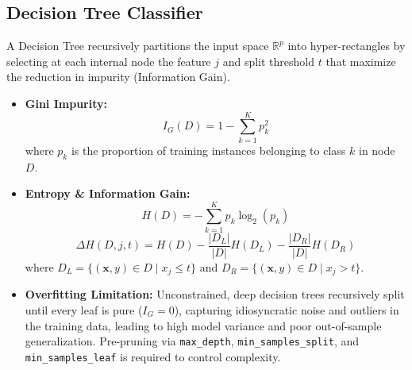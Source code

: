 \documentclass[12pt,a4paper]{article}
\begin{document}
\subsection{Decision Tree Classifier}
A Decision Tree recursively partitions the input space $\mathbb{R}^p$ into hyper-rectangles by selecting at each internal node the feature $j$ and split threshold $t$ that maximize the reduction in impurity (Information Gain).
\begin{itemize}
\item \textbf{Gini Impurity:}
\begin{equation}
I_G(D) = 1 - \sum_{k=1}^K p_k^2
\end{equation}
where $p_k$ is the proportion of training instances belonging to class $k$ in node $D$.
\item \textbf{Entropy \& Information Gain:}
\begin{equation}
H(D) = -\sum_{k=1}^K p_k \log_2 (p_k)
\end{equation}
\begin{equation}
\Delta H(D, j, t) = H(D) - \frac{|D_L|}{|D|} H(D_L) - \frac{|D_R|}{|D|} H(D_R)
\end{equation}
where $D_L = \{(\mathbf{x}, y) \in D \mid x_j \le t\}$ and $D_R = \{(\mathbf{x}, y) \in D \mid x_j > t\}$.
\item \textbf{Overfitting Limitation:} Unconstrained, deep decision trees recursively split until every leaf is pure ($I_G=0$), capturing idiosyncratic noise and outliers in the training data, leading to high model variance and poor out-of-sample generalization. Pre-pruning via \texttt{max\_depth}, \texttt{min\_samples\_split}, and \texttt{min\_samples\_leaf} is required to control complexity.
\end{itemize}
\end{document}
